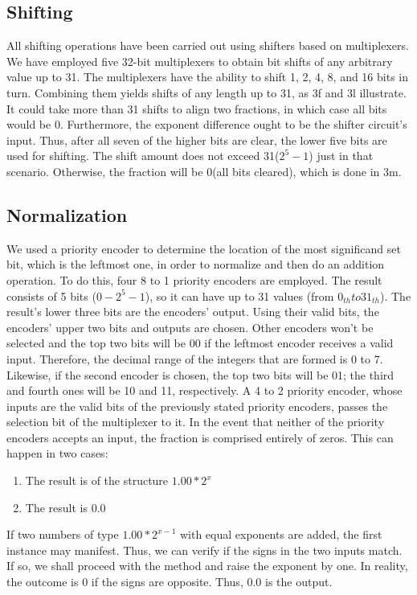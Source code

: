 \documentclass[a4paper,12pt]{article}
\begin{document}
\subsection{Shifting}
All shifting operations have been carried out using shifters based on multiplexers. We have employed five 32-bit multiplexers to obtain bit shifts of any arbitrary value up to 31. The multiplexers have the ability to shift 1, 2, 4, 8, and 16 bits in turn. Combining them yields shifts of any length up to 31, as 3f and 3l illustrate. It could take more than 31 shifts to align two fractions, in which case all bits would be 0. Furthermore, the exponent difference ought to be the shifter circuit's input. Thus, after all seven of the higher bits are clear, the lower five bits are used for shifting. The shift amount does not exceed 31($2^{5}-1$) just in that scenario. Otherwise, the fraction will be 0(all bits cleared), which is done in 3m.

\subsection{Normalization}
We used a priority encoder to determine the location of the most significand set bit, which is the leftmost one, in order to normalize and then do an addition operation. To do this, four 8 to 1 priority encoders are employed. 
The result consists of 5 bits ($0-2^{5}-1$), so it can have up to 31 values (from $0_{th} to 31_{th}$). The result's lower three bits are the encoders' output. Using their valid bits, the encoders' upper two bits and outputs are chosen. Other encoders won't be selected and the top two bits will be 00 if the leftmost encoder receives a valid input. Therefore, the decimal range of the integers that are formed is 0 to 7. Likewise, if the second encoder is chosen, the top two bits will be 01; the third and fourth ones will be 10 and 11, respectively. A 4 to 2 priority encoder, whose inputs are the valid bits of the previously stated priority encoders, passes the selection bit of the multiplexer to it. In the event that neither of the priority encoders accepts an input, the fraction is comprised entirely of zeros. This can happen in two cases:
\begin{enumerate}
    \item The result is of the structure $1.00 * 2^{x}$
    \item The result is $0.0$
\end{enumerate}
If two numbers of type $1.00 * 2^{x-1}$ with equal exponents are added, the first instance may manifest. Thus, we can verify if the signs in the two inputs match. If so, we shall proceed with the method and raise the exponent by one. In reality, the outcome is 0 if the signs are opposite. Thus, 0.0 is the output.
\end{document}
